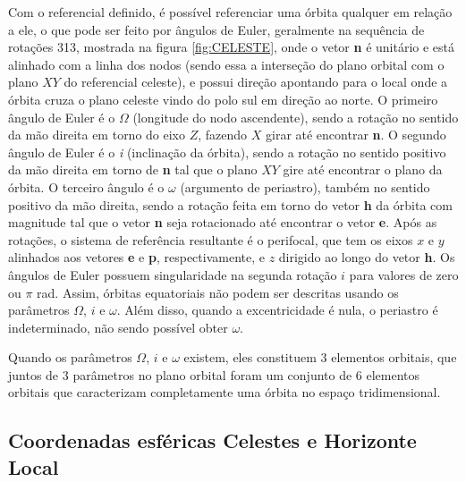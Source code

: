 Com o referencial definido, é possível referenciar uma órbita qualquer em relação a ele, o que pode ser feito por ângulos de Euler, geralmente na sequência de rotações 313, mostrada na figura \ref{fig:CELESTE}, onde o vetor \textbf{n} é unitário e está alinhado com a linha dos nodos (sendo essa a interseção do plano orbital com o plano $XY$ do referencial celeste), e possui direção apontando para o local onde a órbita cruza o plano celeste vindo do polo sul em direção ao norte. O primeiro ângulo de Euler é o $\Omega$ (longitude do nodo ascendente), sendo a rotação no sentido da mão direita em torno do eixo $Z$, fazendo $X$ girar até encontrar \textbf{n}. O segundo ângulo de Euler é o \textit{i} (inclinação da órbita), sendo a rotação no sentido positivo da mão direita em torno de \textbf{n} tal que o plano $XY$ gire até encontrar o plano da órbita. O terceiro ângulo é o $\omega$ (argumento de periastro), também no sentido positivo da mão direita, sendo a rotação feita em torno do vetor \textbf{h} da órbita com magnitude tal que o vetor \textbf{n} seja rotacionado até encontrar o vetor \textbf{e}. Após as rotações, o sistema de referência resultante é o perifocal, que tem os eixos $x$ e $y$ alinhados aos vetores \textbf{e} e \textbf{p}, respectivamente, e $z$ dirigido ao longo do vetor \textbf{h}. Os ângulos de Euler possuem singularidade na segunda rotação $i$ para valores de zero ou $\pi$ rad. Assim, órbitas equatoriais não podem ser descritas usando os parâmetros $\Omega$, $i$ e $\omega$. Além disso, quando a excentricidade é nula, o periastro é indeterminado, não sendo possível obter $\omega$.

Quando os parâmetros $\Omega$, $i$ e $\omega$ existem, eles constituem 3 elementos orbitais, que juntos de 3 parâmetros no plano orbital foram um conjunto de 6 elementos orbitais que caracterizam completamente uma órbita no espaço tridimensional. 


\subsection{Coordenadas esféricas Celestes e Horizonte Local}

